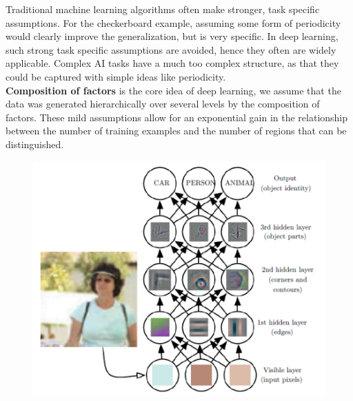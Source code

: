 \begin{multicols}{2}
	Traditional machine learning algorithms often make stronger, task specific assumptions.
	For the checkerboard example, assuming some form of periodicity would clearly improve the generalization, but is very specific.
	In deep learning, such strong task specific assumptions are avoided, hence they often are widely applicable.
	Complex AI tasks have a much too complex structure, as that they could be captured with simple ideas like periodicity.\\
	
	\textbf{Composition of factors} is the core idea of deep learning, we assume that the data was generated hierarchically over several levels by the composition of factors.
	These mild assumptions allow for an exponential gain in the relationship between the number of training examples and the number of regions that can be distinguished.
	\begin{figure}[H]
		\centering
		\includegraphics[width=0.75\linewidth]{images/whut.PNG}
	\end{figure}
	

\end{multicols}
